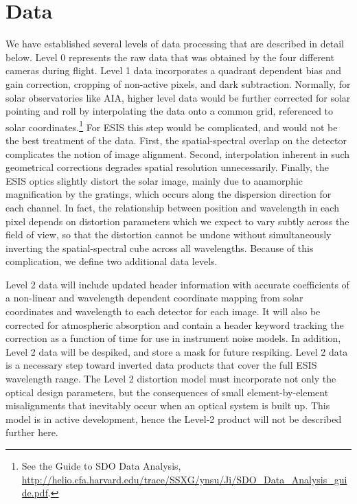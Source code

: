 \section{Data} 
We have established several levels of data processing that are described in detail below.
Level 0 represents the raw data that was obtained by the four different cameras during flight.
Level 1 data incorporates %
a quadrant dependent bias and gain correction, cropping of non-active pixels, and dark subtraction.
Normally, for solar observatories like AIA, higher level data would be further corrected for solar pointing and roll by interpolating the data onto a common grid, referenced to solar coordinates.\footnote{See the Guide to SDO Data Analysis, \url{http://helio.cfa.harvard.edu/trace/SSXG/ynsu/Ji/SDO_Data_Analysis_guide.pdf}.}  For ESIS this step would be complicated, and would not be the best treatment of the data.  
First, the spatial-spectral overlap on the detector complicates the notion of image alignment. Second, interpolation inherent in such geometrical corrections degrades spatial resolution unnecessarily.  
Finally, the ESIS optics slightly distort the solar image, mainly due to anamorphic magnification by the gratings, which occurs along the dispersion direction for each channel. In fact, the relationship between position and wavelength in each pixel depends on distortion parameters which we expect to vary subtly across the field of view, so that the distortion cannot be undone without simultaneously inverting the spatial-spectral cube across all wavelengths.  Because of this complication, we define two additional data levels.  

Level 2 data will include updated header information with accurate coefficients of a non-linear and wavelength dependent coordinate mapping from solar coordinates and wavelength to each detector for each image. It will also be corrected for atmospheric absorption and contain a header keyword tracking the correction as a function of time for use in instrument noise models.
In addition, Level 2 data will be despiked, and store a mask for future respiking.
Level 2 data is a necessary step toward inverted data products that cover the full ESIS wavelength range. The Level 2 distortion model must incorporate not only the optical design parameters, but the consequences of small element-by-element misalignments that inevitably occur when an optical system is built up.  This model is in active development, hence the Level-2 product will not be described further here.

